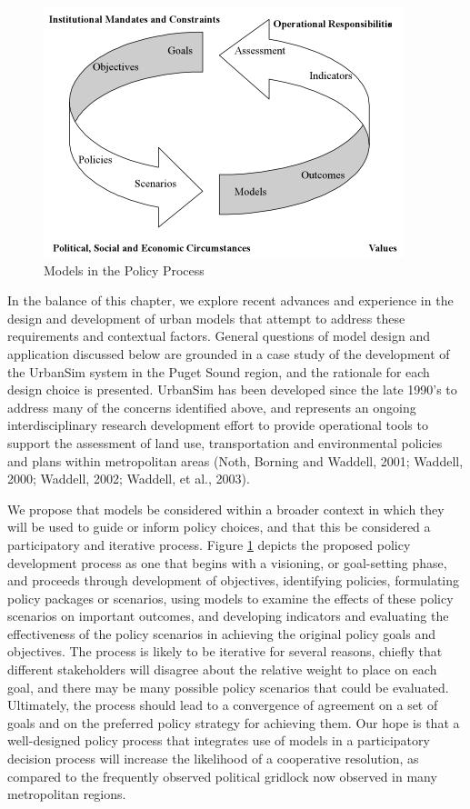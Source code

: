 \begin{figure}[htp]
\begin{center}
\includegraphics[scale=0.8]{graphics/models-in-process.png}
\end{center}
\caption{Models in the Policy Process}
\label{fig:models-in-process}
\end{figure}

In the balance of this chapter, we explore recent advances and experience in the design and development of urban models that attempt to address these requirements and contextual factors.  General questions of model design and application discussed below are grounded in a case study of the development of the UrbanSim system in the Puget Sound region, and the rationale for each design choice is presented.  UrbanSim has been developed since the late 1990's to address many of the concerns identified above, and represents an ongoing interdisciplinary research development effort to provide operational tools to support the assessment of land use, transportation and environmental policies and plans within metropolitan areas (Noth, Borning and Waddell, 2001; Waddell, 2000; Waddell, 2002; Waddell, et al., 2003).

We propose that models be considered within a broader context in which they will be used to guide or inform policy choices, and that this be considered a participatory and iterative process.  Figure \ref{fig:models-in-process} depicts the proposed policy development process as one that begins with a visioning, or goal-setting phase, and proceeds through development of objectives, identifying policies, formulating policy packages or scenarios, using models to examine the effects of these policy scenarios on important outcomes, and developing indicators and evaluating the effectiveness of the policy scenarios in achieving the original policy goals and objectives.  The process is likely to be iterative for several reasons, chiefly that different stakeholders will disagree about the relative weight to place on each goal, and there may be many possible policy scenarios that could be evaluated.  Ultimately, the process should lead to a convergence of agreement on a set of goals and on the preferred policy strategy for achieving them.  Our hope is that a well-designed policy process that integrates use of models in a participatory decision process will increase the likelihood of a cooperative resolution, as compared to the frequently observed political gridlock now observed in many metropolitan regions.

